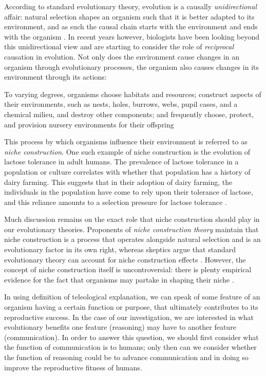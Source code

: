 According to standard evolutionary theory, evolution is a causally \emph{unidirectional} affair: natural selection shapes an organism such that it is better adapted to its environment, and as such the causal chain starts with the environment and ends with the organism \citep{Laland13}.
In recent years however, biologists have been looking beyond this unidirectional view and are starting to consider the role of \emph{reciprocal} causation in evolution. Not only does the environment cause changes in an organism through evolutionary processes, the organism also causes changes in its environment through its actions:
\begin{quoting}
    To varying degrees, organisms choose habitats and resources; construct aspects of their environments, such as nests, holes, burrows, webs, pupil cases, and a chemical milieu, and destroy other components; and frequently choose, protect, and provision nursery environments for their offspring
\hfill \citep[p.~81]{Day03}
\end{quoting}
This process by which organisms influence their environment is referred to as \emph{niche construction}.
One such example of niche construction is the evolution of lactose tolerance in adult humans. The prevalence of lactose tolerance in a population or culture correlates with whether that population has a history of dairy farming. This suggests that in their adoption of dairy farming, the individuals in the population have come to rely upon their tolerance of lactose, and this reliance amounts to a selection pressure for lactose tolerance \citep{S-P13}.

Much discussion remains on the exact role that niche construction should play in our evolutionary theories. Proponents of \emph{niche construction theory} maintain that niche construction is a process that operates alongside natural selection and is an evolutionary factor in its own right, whereas skeptics argue that standard evolutionary theory can account for niche construction effects \citep{S-P13}. However, the concept of niche construction itself is uncontroversial: there is plenty empirical evidence for the fact that organisms may partake in shaping their niche \citep{S-P13}.

In using  definition of teleological explanation, we can speak of some feature of an organism having a certain function or purpose, that ultimately contributes to its reproductive success. In the case of our investigation, we are interested in what evolutionary benefits one feature (reasoning) may have to another feature (communication). In order to answer this question, we should first consider what the function of communication is to humans; only then can we consider whether the function of reasoning could be to advance communication and in doing so improve the reproductive fitness of humans.

